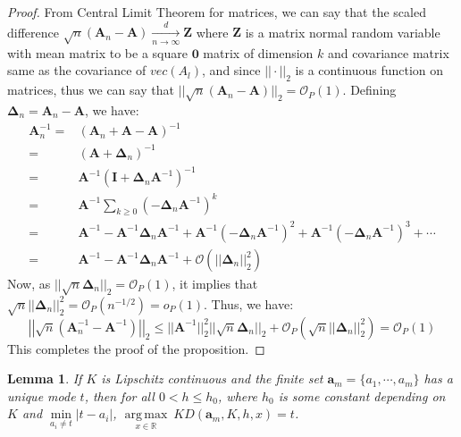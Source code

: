 \documentclass[
  12pt]{article}
\DeclareMathOperator*{\argmax}{arg\,max}
\newcommand{\dnlim}{\xrightarrow[n \to \infty]{d}}
\newcommand{\R}{\mathbb{R}}
\newcommand{\bigo}{\mathcal{O}}
\newcommand{\smallo}{o}
\newcommand{\ba}{\boldsymbol{a}}
\newcommand{\bDel}{\boldsymbol{\Delta}}
\newcommand{\bA}{\boldsymbol{A}}
\newcommand{\bZ}{\boldsymbol{Z}}
\newcommand{\bI}{\boldsymbol{I}}
\newtheorem{lemma}{Lemma}
\newcommand{\bzero}{\boldsymbol{0}}
\begin{document}
\begin{proof}
From Central Limit Theorem for matrices, we can say that the scaled difference $\sqrt{n}\left(\bA_n - \bA\right) \dnlim \bZ$ where $\bZ$ is a matrix normal random variable with mean matrix to be a square $\bzero$ matrix of dimension $k$ and covariance matrix same as the covariance of $vec(A_l)$, and since $||\cdot||_2$ is a continuous function on matrices, thus we can say that $||\sqrt{n}(\bA_n - \bA)||_2 = \bigo_P(1)$. Defining $\bDel_n = \bA_n - \bA$, we have:
$$
\begin{aligned}
    \bA_n^{-1} = & (\bA_n + \bA - \bA)^{-1}\\
    = & (\bA + \bDel_n)^{-1}\\
    = & \bA^{-1}\left(\bI + \bDel_n\bA^{-1}\right)^{-1}\\
    = & \bA^{-1}\sum_{k\geq 0}\left(-\bDel_n\bA^{-1}\right)^k\\
    = & \bA^{-1} -\bA^{-1}\bDel_n\bA^{-1} + \bA^{-1}\left(-\bDel_n\bA^{-1}\right)^2 + \bA^{-1}\left(-\bDel_n\bA^{-1}\right)^3 + \cdots \\
    = & \bA^{-1} -\bA^{-1}\bDel_n\bA^{-1} + \bigo\left(||\bDel_n||_2^2\right)
\end{aligned}
$$
Now, as $||\sqrt{n}\bDel_n||_2 = \bigo_P(1)$, it implies that $\sqrt{n}||\bDel_n||_2^2 = \bigo_P(n^{-1/2}) = \smallo_P(1)$. Thus, we have:
$$
\left|\left|\sqrt{n}(\bA_n^{-1} - \bA^{-1})\right|\right|_2 \leq ||\bA^{-1}||_2^2||\sqrt{n}\bDel_n||_2 + \bigo_P(\sqrt{n}||\bDel_n||_2^2) = \bigo_P(1) 
$$
This completes the proof of the proposition. \end{proof}
\begin{lemma}\label{lem:plurality-guarantee}
If $K$ is Lipschitz continuous and the finite set $\ba_m = \{a_1, \cdots, a_m\}$ has a unique mode $t$, then for all $0<h \leq h_0$, where $h_0$ is some constant depending on $K$ and $\underset{a_i \neq t}{\min} |t - a_i|$, $
    \underset{x\in \R}{\argmax}\ KD(\ba_m, K,h,x)=t
    $.
\end{lemma}
\end{document}

